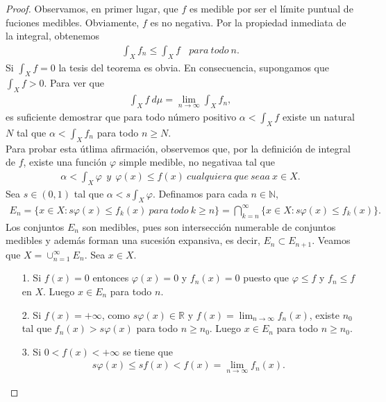 \begin{proof}
Observamos, en primer lugar, que $f$ es medible por ser el límite puntual de fuciones medibles. Obviamente, $f$ es no negativa. Por la propiedad inmediata de la integral, obtenemos 
\begin{align*}
    \int_{X}{f_n} \leq \int_{X}{f} \ \ \ \ para \ todo \ n.
\end{align*}
Si $\int_{X}{f} = 0$ la tesis del teorema es obvia. En consecuencia, supongamos que $\int_{X}{f} > 0$. Para ver que
\begin{align*}
    \int_{X}{f \ d\mu} = \lim_{n \to \infty}{\int_{X}{f_n}},
\end{align*}
es suficiente demostrar que para todo número positivo $\alpha < \int_{X}{f}$ existe un natural $N$ tal que $\alpha < \int_{X}{f_n}$ para todo $n \ge N$.
\\
\newline
Para probar esta útlima afirmación, observemos que, por la definición de integral de $f$, existe una función $\varphi$ simple medible, no negativaa tal que
\begin{align*}
    \alpha < \int_{X}{\varphi} \ \ y \ \ \varphi(x) \leq  f(x) \ cualquiera \ que \ seaa \ x \in X.
\end{align*}
Sea $s \in (0,1)$ tal que $\alpha < s\int_{X}{\varphi}$. Definamos para cada $n \in \mathbb{N}$,
\begin{align*}
    E_n = \{ x \in X : s\varphi(x) \leq f_k(x) \ para \ todo \ k \ge n \} = \bigcap_{k=n}^{\infty}{\{ x \in X : s\varphi(x) \leq f_k(x)\}}.
\end{align*}
Los conjuntos $E_n$ son medibles, pues son intersección numerable de conjuntos medibles y además forman una sucesión expansiva, es decir, $E_n \subset E_{n+1}$. Veamos que $X = \cup_{n=1}^{\infty}{E_n}$. Sea $x \in X$.
\begin{enumerate}
    \item[1.] Si $f(x) = 0$ entonces $\varphi(x) = 0$ y $f_n(x) = 0$ puesto que $\varphi \leq f$ y $f_n \leq f$ en $X$. Luego $x \in E_n$ para todo $n$.
    \item[2.] Si $f(x) = +\infty$, como $s\varphi(x) \in \mathbb{R}$ y $f(x) = \lim_{n \to \infty}{f_n(x)}$, existe $n_0$ tal que $f_n(x) > s\varphi(x)$ para todo $n \ge n_0$. Luego $x \in E_n$ para todo $n \ge n_0$.
    \item[3.] Si $0 < f(x) < +\infty$ se tiene que
    \begin{align*}
        s\varphi(x) \leq sf(x) < f(x) = \lim_{n \to \infty}{f_n(x)}.
    \end{align*}

\end{enumerate}
\end{proof}
